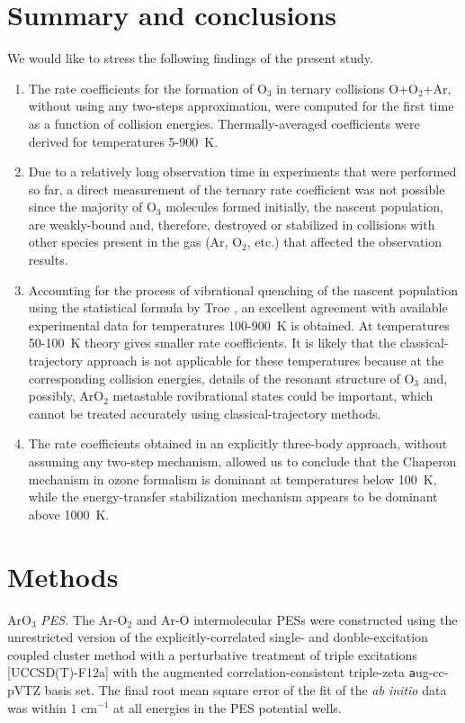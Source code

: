 \documentclass[aps,prl,twocolumn,showpacs,preprintnumbers,amsmath,amssymb,floatfix]{revtex4-2}
\begin{document}
\section{Summary and conclusions}
We would like to stress the following findings of the present study.
\begin{enumerate}
 \item 
The rate coefficients for the formation of O$_3$ in ternary collisions O+O$_2$+Ar, without using any two-steps approximation, were computed for the first time as a function of collision energies. Thermally-averaged coefficients were derived for temperatures 5-900~K. 
 \item 
Due to a relatively long observation time in experiments that were performed so far, a direct measurement of the ternary rate coefficient was not possible since the majority of O$_3$ molecules formed initially, the nascent population, are weakly-bound and, therefore, destroyed or stabilized in collisions with other species present in the gas (Ar, O$_2$, etc.) that affected the observation results.
 \item 
Accounting for the process of vibrational quenching of the nascent population using the statistical formula by Troe \cite{troe1977theory}, an excellent agreement with available experimental data for temperatures 100-900~K is obtained. At temperatures 50-100~K theory gives smaller rate coefficients. It is likely that the classical-trajectory approach is not applicable for these temperatures because at the corresponding collision energies, details of the resonant structure of O$_3$ and, possibly, ArO$_2$ metastable rovibrational states could be important, which cannot be treated accurately using  classical-trajectory methods.
 \item 
The rate coefficients obtained in an explicitly three-body approach, without assuming any two-step mechanism, allowed us to conclude that the Chaperon mechanism in ozone formalism is dominant at temperatures below 100~K, while the energy-transfer stabilization mechanism appears to be dominant above 1000~K.
 \end{enumerate}
 
\section{Methods}
{ArO$_3$ \it PES.}
The Ar-O$_2$ and Ar-O intermolecular PESs were constructed using the unrestricted version of the explicitly-correlated single- and double-excitation coupled cluster method with a perturbative treatment of triple excitations [UCCSD(T)-F12a] with the augmented correlation-consistent triple-zeta {\texttt aug-cc-pVTZ} basis set. The final root mean square error of the fit of the {\it ab initio} data was within 1 cm$^{-1}$ at all energies in the PES potential wells. 
\end{document}
